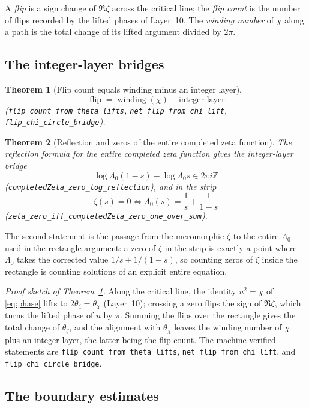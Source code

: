 \documentclass{article}
\newtheorem{theorem}{Theorem}[section]
\newcommand{\Z}{\mathbb{Z}}
\newcommand{\zt}{\zeta}
\newcommand{\Lam}{\Lambda}
\newcommand{\Xchi}{\chi}
\begin{document}
A \emph{flip} is a sign change of $\Re\zt$ across the critical line; the
\emph{flip count} is the number of flips recorded by the lifted phases of
Layer~10. The \emph{winding number} of $\Xchi$ along a path is the total
change of its lifted argument divided by $2\pi$.

\subsection{The integer-layer bridges}
\label{sec:bridge}

\begin{theorem}[Flip count equals winding minus an integer layer]
\label{thm:flipcount}
\[
\operatorname{flip}=\operatorname{winding}(\Xchi)-\text{integer layer}
\]
(\texttt{flip\_count\_from\_theta\_lifts},
\texttt{net\_flip\_from\_chi\_lift}, \texttt{flip\_chi\_circle\_bridge}).
\end{theorem}

\begin{theorem}[Reflection and zeros of the entire completed zeta function]
\label{thm:reflection}
The reflection formula for the entire completed zeta function gives the
integer-layer bridge
\[
\log\Lam_0(1-s)-\log\Lam_0 s\in 2\pi i\Z
\]
(\texttt{completedZeta\_zero\_log\_reflection}), and in the strip
\[
\zt(s)=0\iff\Lam_0(s)=\frac{1}{s}+\frac{1}{1-s}
\]
(\texttt{zeta\_zero\_iff\_completedZeta\_zero\_one\_over\_sum}).
\end{theorem}

The second statement is the passage from the meromorphic $\zt$ to the
entire $\Lam_0$ used in the rectangle argument: a zero of $\zt$ in the
strip is exactly a point where $\Lam_0$ takes the corrected value
$1/s+1/(1-s)$, so counting zeros of $\zt$ inside the rectangle is counting
solutions of an explicit entire equation.

\emph{Proof sketch of Theorem~\ref{thm:flipcount}.} Along the critical
line, the identity $u^2=\Xchi$ of \eqref{eq:phase} lifts to
$2\theta_{\zt}=\theta_{\Xchi}$ (Layer~10); crossing a zero flips the sign
of $\Re\zt$, which turns the lifted phase of $u$ by $\pi$. Summing the
flips over the rectangle gives the total change of $\theta_{\zt}$, and the
alignment with $\theta_{\Xchi}$ leaves the winding number of $\Xchi$ plus
an integer layer, the latter being the flip count. The machine-verified
statements are \texttt{flip\_count\_from\_theta\_lifts},
\texttt{net\_flip\_from\_chi\_lift}, and
\texttt{flip\_chi\_circle\_bridge}.

\subsection{The boundary estimates}
\label{sec:boundary}
\end{document}
